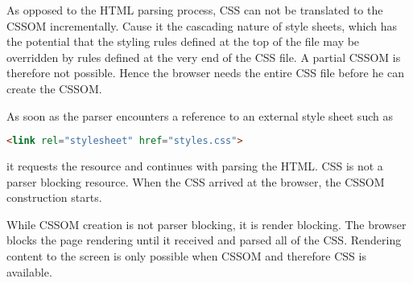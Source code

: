 



As opposed to the HTML parsing process, CSS can not be translated to the CSSOM incrementally.
Cause it the cascading nature of style sheets, which has the potential that the styling rules defined at the top of the file may be overridden by rules defined at the very end of the CSS file.
A partial CSSOM is therefore not possible.
Hence the browser needs the entire CSS file before he can create the CSSOM.



As soon as the parser encounters a reference to an external style sheet such as

\begin{lstlisting}[language=html, numbers=none]
<link rel="stylesheet" href="styles.css">
\end{lstlisting}

it requests the resource and continues with parsing the HTML.
CSS is not a parser blocking resource.
When the CSS arrived at the browser, the CSSOM construction starts.







While CSSOM creation is not parser blocking, it is render blocking.
The browser blocks the page rendering until it received and parsed all of the CSS.
Rendering content to the screen is only possible when CSSOM and therefore CSS is available. %


